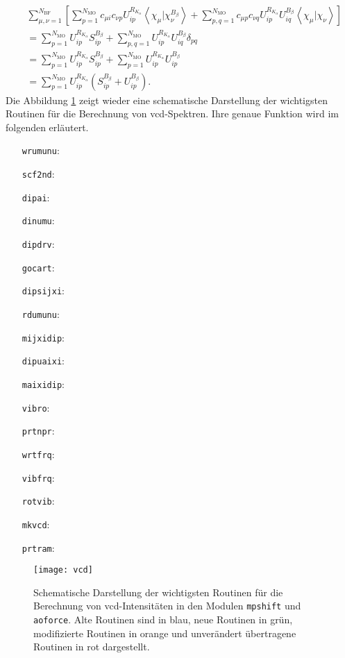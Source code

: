 	\begin{equation}
	\begin{aligned}
	&\sum_{\mu,\nu=1}^{N_{\text{BF}}}\left[\sum_{p=1}^{N_{\text{MO}}}c_{\mu i}c_{\nu p}U_{ip}^{R_{K_\alpha}}\left\langle\chi_\mu\vert\chi_\nu^{B_{\beta}}\right\rangle+\sum_{p,q=1}^{N_{\text{MO}}}c_{\mu p}c_{\nu q}U_{ip}^{R_{K_\alpha}}U_{iq}^{B_\beta}\left\langle\chi_\mu\vert\chi_\nu\right\rangle\right]\\
	&=\sum_{p=1}^{N_{\text{MO}}}U_{ip}^{R_{K_\alpha}}S_{ip}^{B_\beta}+\sum_{p,q=1}^{N_{\text{MO}}}U_{ip}^{R_{K_\alpha}}U_{iq}^{B_\beta}\delta_{pq}\\
	&=\sum_{p=1}^{N_{\text{MO}}}U_{ip}^{R_{K_\alpha}}S_{ip}^{B_\beta}+\sum_{p=1}^{N_{\text{MO}}}U_{ip}^{R_{K_\alpha}}U_{ip}^{B_\beta}\\
	&=\sum_{p=1}^{N_{\text{MO}}}U_{ip}^{R_{K_\alpha}}\left(S_{ip}^{B_\beta}+U_{ip}^{B_\beta}\right).
	\end{aligned}
	\end{equation}
	Die Abbildung \ref{abb:programmstrukur_vcd} zeigt wieder eine schematische Darstellung der wichtigsten Routinen für die Berechnung von \ac{vcd}-Spektren. Ihre genaue Funktion wird im folgenden erläutert. 
\begin{itemize}
	\item[\texttt{wrumunu}:]
	\item[\texttt{scf2nd}:]
	\item[\texttt{dipai}:]
	\item[\texttt{dinumu}:]
	\item[\texttt{dipdrv}:]
	\item[\texttt{gocart}:]
	\item[\texttt{dipsijxi}:]
	\item[\texttt{rdumunu}:]
	\item[\texttt{mijxidip}:]
	\item[\texttt{dipuaixi}:]
	\item[\texttt{maixidip}:]
	\item[\texttt{vibro}:]
	\item[\texttt{prtnpr}:]
	\item[\texttt{wrtfrq}:]
	\item[\texttt{vibfrq}:]
	\item[\texttt{rotvib}:]
	\item[\texttt{mkvcd}:]
	\item[\texttt{prtram}:]
\end{itemize}
	
	\begin{figure}[ht!]
	\centering
	\texttt{[image: vcd]}
	\captionsetup{figurewithin = chapter}
	\captionsetup{font=small, labelfont=bf}\caption[Wichtigste Routinen für die Berechnung von VCD-Intensitäten]{Schematische Darstellung der wichtigsten Routinen für die Berechnung von \ac{vcd}-Intensitäten in den Modulen \texttt{mpshift} und \texttt{aoforce}. Alte Routinen sind in blau, neue Routinen in grün, modifizierte Routinen in orange und unverändert übertragene Routinen in rot dargestellt.}
\label{abb:programmstrukur_vcd}
\end{figure}	   
	
